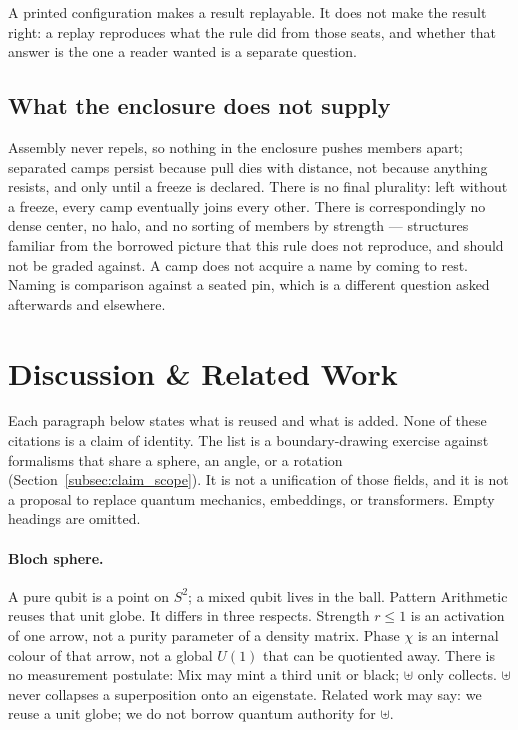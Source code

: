 \documentclass[12pt, a4paper]{article}
\begin{document}
A printed configuration makes a result replayable. It does not make
the result right: a replay reproduces what the rule did from those seats, and whether that answer is the one a reader wanted is a
separate question.

\subsection{What the enclosure does not supply}
\label{subsec:enclosure_open}
Assembly never repels, so nothing in the enclosure pushes members
apart; separated camps persist because pull dies with distance, not
because anything resists, and only until a freeze is declared. There
is no final plurality: left without a freeze, every camp eventually
joins every other. There is correspondingly no dense center, no halo,
and no sorting of members by strength --- structures familiar from
the borrowed picture that this rule does not reproduce, and should not
be graded against. A camp does not acquire a name by coming to rest.
Naming is comparison against a seated pin, which is a different
question asked afterwards and elsewhere.


\section{Discussion \& Related Work}
\label{sec:related}

Each paragraph below states what is reused and what is added. None of
these citations is a claim of identity. The list is a
boundary-drawing exercise against formalisms that share a sphere, an
angle, or a rotation
(Section~\ref{subsec:claim_scope}). It is not a unification of those
fields, and it is not a proposal to replace quantum mechanics,
embeddings, or transformers. Empty headings are omitted.

\paragraph{Bloch sphere.}
A pure qubit is a point on $S^2$; a mixed qubit lives in the ball.
Pattern Arithmetic reuses that unit globe. It differs in three
respects. Strength $r\le 1$ is an activation of one arrow, not a purity
parameter of a density matrix. Phase $\chi$ is an internal colour of
that arrow, not a global $U(1)$ that can be quotiented away. There is
no measurement postulate: Mix may mint a third unit or black; $\uplus$
only collects. $\uplus$ never collapses a superposition onto an eigenstate. Related work
may say: we reuse a unit globe; we do not borrow quantum authority for
$\uplus$.
\end{document}
